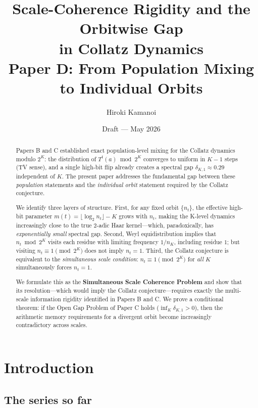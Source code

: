 \documentclass[12pt]{article}
\title{Scale-Coherence Rigidity and the Orbitwise Gap\\
in Collatz Dynamics\\[0.5em]
{\large Paper D: From Population Mixing to Individual Orbits}}
\author{Hiroki Kamanoi}
\date{Draft --- May 2026}
\theoremstyle{definition}
\begin{document}
\maketitle

\begin{abstract}
Papers B and C established exact population-level mixing for the Collatz dynamics modulo $2^K$: the distribution of $T^t(a) \bmod 2^K$ converges to uniform in $K-1$ steps (TV sense), and a single high-bit flip already creates a spectral gap $\delta_{K,1} \approx 0.29$ independent of $K$. The present paper addresses the fundamental gap between these \emph{population} statements and the \emph{individual orbit} statement required by the Collatz conjecture.

We identify three layers of structure. First, for any fixed orbit $\{n_t\}$, the effective high-bit parameter $m(t) = \lfloor\log_2 n_t\rfloor - K$ grows with $n_t$, making the K-level dynamics increasingly close to the true 2-adic Haar kernel---which, paradoxically, has \emph{exponentially small} spectral gap. Second, Weyl equidistribution implies that $n_t \bmod 2^K$ visits each residue with limiting frequency $1/n_K$, including residue $1$; but visiting $n_t \equiv 1 \pmod{2^K}$ does not imply $n_t = 1$. Third, the Collatz conjecture is equivalent to the \emph{simultaneous scale condition}: $n_t \equiv 1 \pmod{2^K}$ for \emph{all} $K$ simultaneously forces $n_t = 1$.

We formulate this as the \textbf{Simultaneous Scale Coherence Problem} and show that its resolution---which would imply the Collatz conjecture---requires exactly the multi-scale information rigidity identified in Papers B and C. We prove a conditional theorem: if the Open Gap Problem of Paper C holds ($\inf_K \delta_{K,1} > 0$), then the arithmetic memory requirements for a divergent orbit become increasingly contradictory across scales.
\end{abstract}

\tableofcontents\bigskip

\section{Introduction}

\subsection{The series so far}
\end{document}
